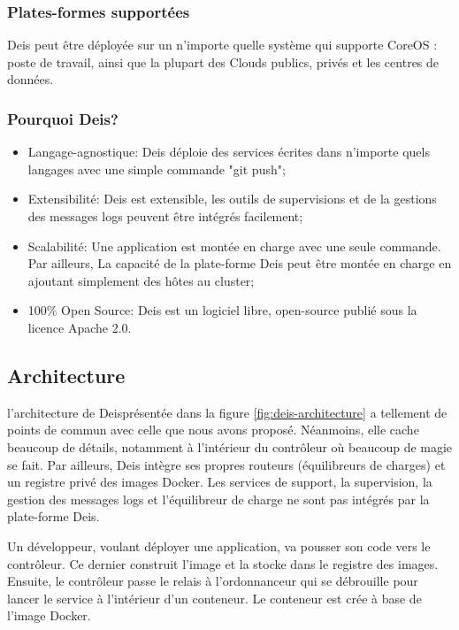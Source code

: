 \begin{onehalfspace}
\subsubsection*{Plates-formes supportées}
Deis peut être déployée sur un n'importe quelle système qui supporte CoreOS : poste de travail, ainsi que la plupart des Clouds publics, privés et les centres de données.


\subsubsection*{Pourquoi Deis?}

\begin{itemize}
	\item Langage-agnostique: Deis déploie des services écrites dans n'importe quels langages avec une simple commande "git push";
	\item Extensibilité: Deis est extensible, les outils de supervisions et de la gestions des messages logs peuvent être intégrés facilement;
	\item Scalabilité: Une application est montée en charge avec une seule commande. Par ailleurs, La capacité de la plate-forme Deis peut être montée en charge en ajoutant simplement des hôtes au cluster;
	\item 100\% Open Source: Deis est un logiciel libre, open-source publié sous la licence Apache 2.0.
\end{itemize}


\subsection{Architecture}

l'architecture de Deisprésentée dans la figure \ref{fig:deis-architecture} a tellement de points de commun avec celle que nous avons proposé. Néanmoins, elle cache beaucoup de détails, notamment à l'intérieur du contrôleur où beaucoup de magie se fait. Par ailleurs, Deis intègre ses propres routeurs (équilibreurs de charges) et un registre privé des images Docker. Les services de support, la supervision, la gestion des messages logs et l'équilibreur de charge ne sont pas intégrés par la plate-forme Deis.

Un développeur, voulant déployer une application, va pousser son code vers le contrôleur. Ce dernier construit l'image et la stocke dans le registre des images. Ensuite, le contrôleur passe le relais à l'ordonnanceur qui se débrouille pour lancer le service à l'intérieur d'un conteneur. Le conteneur est crée à base de l'image Docker.




\end{onehalfspace}
